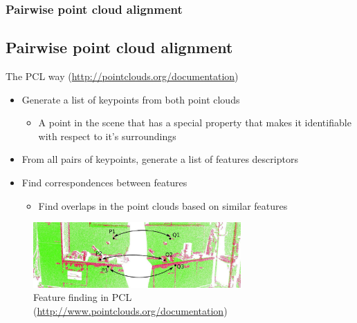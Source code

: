 \documentclass[10pt,serif,t]{beamer}
\newenvironment{SubSlide}[1]
{
  \begin{frame}[fragile,environment=SubSlide]
    \frametitle{#1}
    \subsection{#1}
  }
  {
  \end{frame}
}
\begin{document}
\begin{SubSlide}{Pairwise point cloud alignment}
  The PCL way (\url{http://pointclouds.org/documentation})

  \vspace{1em}

  \pause

  \begin{itemize}
    \item
      Generate a list of keypoints from both point clouds

      \begin{itemize}
        \item
          A point in the scene that has a special property that makes it
          identifiable with respect to it's surroundings

      \end{itemize}

      \pause

    \item
      From all pairs of keypoints, generate a list of features descriptors

      \pause

    \item
      Find correspondences between features

      \begin{itemize}
        \item
          Find overlaps in the point clouds based on similar features

      \end{itemize}

      \pause
  \end{itemize}

  \begin{figure}
    \centering
    \includegraphics[height=2.5cm]{graphics/pcl_features.eps}
    \caption{Feature finding in PCL (\url{http://www.pointclouds.org/documentation})}
    \label{fig:pcl_features}
  \end{figure}
\end{SubSlide}
\end{document}
